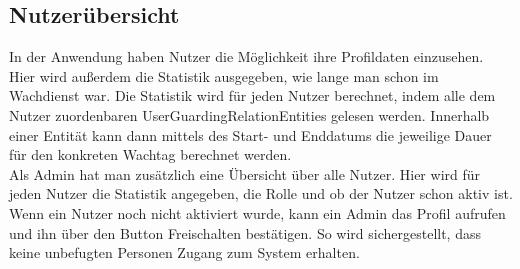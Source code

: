 \documentclass[fontsize=12pt,openright,oneside,paper=a4,BCOR=1cm]{scrbook}
\begin{document}
\subsection{Nutzerübersicht}

In der Anwendung haben Nutzer die Möglichkeit ihre Profildaten einzusehen. Hier wird außerdem die Statistik ausgegeben, wie lange man schon im Wachdienst war. Die Statistik wird für jeden Nutzer berechnet, indem alle dem Nutzer zuordenbaren \glqq UserGuardingRelationEntities\grqq{} gelesen werden. Innerhalb einer Entit\"at kann dann mittels des Start- und Enddatums die jeweilige Dauer f\"ur den konkreten Wachtag berechnet werden.\\
Als Admin hat man zusätzlich eine Übersicht über alle Nutzer. Hier wird für jeden Nutzer die Statistik angegeben, die Rolle und ob der Nutzer schon aktiv ist. Wenn ein Nutzer noch nicht aktiviert wurde, kann ein Admin das Profil aufrufen und ihn über den Button \glqq Freischalten\grqq{} bestätigen. So wird sichergestellt, dass keine unbefugten Personen Zugang zum System erhalten.
\end{document}
